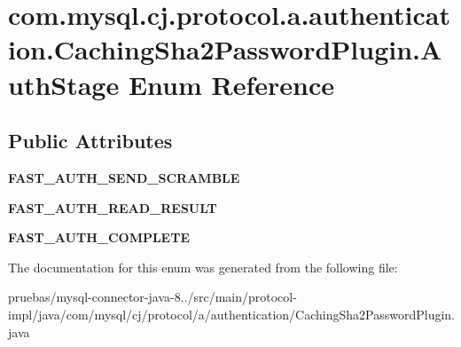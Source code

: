 \hypertarget{enumcom_1_1mysql_1_1cj_1_1protocol_1_1a_1_1authentication_1_1_caching_sha2_password_plugin_1_1_auth_stage}{}\section{com.\+mysql.\+cj.\+protocol.\+a.\+authentication.\+Caching\+Sha2\+Password\+Plugin.\+Auth\+Stage Enum Reference}
\label{enumcom_1_1mysql_1_1cj_1_1protocol_1_1a_1_1authentication_1_1_caching_sha2_password_plugin_1_1_auth_stage}
\subsection*{Public Attributes}
\begin{DoxyCompactItemize}
\item 
\mbox{\label{enumcom_1_1mysql_1_1cj_1_1protocol_1_1a_1_1authentication_1_1_caching_sha2_password_plugin_1_1_auth_stage_a6ad947b5f87d212bf1d752a0d8fd74e5}} 
{\bfseries F\+A\+S\+T\+\_\+\+A\+U\+T\+H\+\_\+\+S\+E\+N\+D\+\_\+\+S\+C\+R\+A\+M\+B\+LE}
\item 
\mbox{\label{enumcom_1_1mysql_1_1cj_1_1protocol_1_1a_1_1authentication_1_1_caching_sha2_password_plugin_1_1_auth_stage_ad678e471f17fd501e628f965c0f166e6}} 
{\bfseries F\+A\+S\+T\+\_\+\+A\+U\+T\+H\+\_\+\+R\+E\+A\+D\+\_\+\+R\+E\+S\+U\+LT}
\item 
\mbox{\label{enumcom_1_1mysql_1_1cj_1_1protocol_1_1a_1_1authentication_1_1_caching_sha2_password_plugin_1_1_auth_stage_aa26c473cfdb29985bc079b810012b01c}} 
{\bfseries F\+A\+S\+T\+\_\+\+A\+U\+T\+H\+\_\+\+C\+O\+M\+P\+L\+E\+TE}
\end{DoxyCompactItemize}


The documentation for this enum was generated from the following file\+:\begin{DoxyCompactItemize}
\item 
pruebas/mysql-\/connector-\/java-\/8../src/main/protocol-\/impl/java/com/mysql/cj/protocol/a/authentication/Caching\+Sha2\+Password\+Plugin.\+java\end{DoxyCompactItemize}
